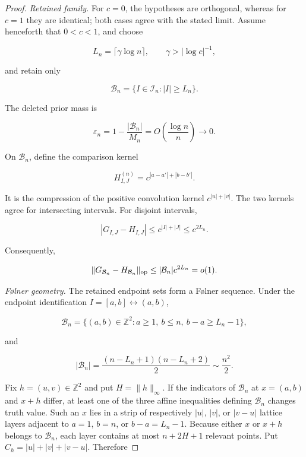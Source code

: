 \begin{proof}
\emph{Retained family.}
For \(c=0\), the hypotheses are orthogonal, whereas for \(c=1\) they are
identical; both cases agree with the stated limit. Assume henceforth that
\(0<c<1\), and choose

\[
L_n=\lceil\gamma\log n\rceil,
\qquad \gamma>|\log c|^{-1},
\]

and retain only

\[
\mathcal B_n=\{I\in\mathcal I_n:|I|\ge L_n\}.
\]

The deleted prior mass is

\begin{equation}\label{eq:short-interval-mass}
\varepsilon_n
=1-\frac{|\mathcal B_n|}{M_n}
=O\!\left(\frac{\log n}{n}\right)\to0.
\end{equation}

On \(\mathcal B_n\), define the comparison kernel

\begin{equation}\label{eq:comparison-kernel}
H^{(n)}_{I,J}=c^{|a-a'|+|b-b'|}.
\end{equation}

It is the compression of the positive convolution kernel \(c^{|u|+|v|}\). The two kernels agree for intersecting intervals. For disjoint intervals,

\[
|G_{I,J}-H_{I,J}|
\le c^{|I|+|J|}\le c^{2L_n}.
\]

Consequently,

\begin{equation}\label{eq:comparison-operator}
\|G_{\mathcal B_n}-H_{\mathcal B_n}\|_{\rm op}
\le|\mathcal B_n|c^{2L_n}=o(1).
\end{equation}

\emph{Følner geometry.}
The retained endpoint sets form a Følner sequence. Under the endpoint
identification \(I=[a,b]\leftrightarrow(a,b)\),

\[
\mathcal B_n
=\{(a,b)\in\mathbb Z^2:a\ge1,\ b\le n,\ b-a\ge L_n-1\},
\]

and

\begin{equation}\label{eq:long-domain-cardinality}
|\mathcal B_n|
=\frac{(n-L_n+1)(n-L_n+2)}2
\sim\frac{n^2}{2}.
\end{equation}

Fix \(h=(u,v)\in\mathbb Z^2\) and put \(H=\|h\|_\infty\). If the indicators
of \(\mathcal B_n\) at \(x=(a,b)\) and \(x+h\) differ, at least one of the
three affine inequalities defining \(\mathcal B_n\) changes truth value.
Such an \(x\) lies in a strip of respectively \(|u|\), \(|v|\), or
\(|v-u|\) lattice layers adjacent to
\(a=1\), \(b=n\), or \(b-a=L_n-1\). Because either \(x\) or \(x+h\) belongs
to \(\mathcal B_n\), each layer contains at most \(n+2H+1\) relevant points.
Put \(C_h=|u|+|v|+|v-u|\). Therefore


\end{proof}
